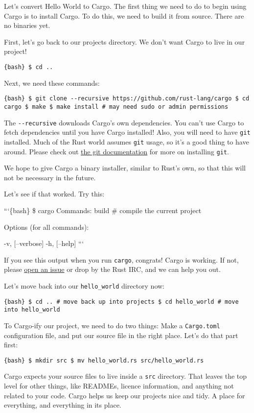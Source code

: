 \documentclass[]{article}
\begin{document}
Let's convert Hello World to Cargo. The first thing we need to do to
begin using Cargo is to install Cargo. To do this, we need to build it
from source. There are no binaries yet.

First, let's go back to our projects directory. We don't want Cargo to
live in our project!

\texttt{\{bash\} \$ cd ..}

Next, we need these commands:

\texttt{\{bash\} \$ git clone -\/-recursive https://github.com/rust-lang/cargo \$ cd cargo \$ make \$ make install \# may need sudo or admin permissions}

The \texttt{-\/-recursive} downloads Cargo's own dependencies. You can't
use Cargo to fetch dependencies until you have Cargo installed! Also,
you will need to have \texttt{git} installed. Much of the Rust world
assumes \texttt{git} usage, so it's a good thing to have around. Please
check out
\href{http://git-scm.com/book/en/Getting-Started-Installing-Git}{the git
documentation} for more on installing \texttt{git}.

We hope to give Cargo a binary installer, similar to Rust's own, so that
this will not be necessary in the future.

Let's see if that worked. Try this:

```\{bash\} \$ cargo Commands: build \# compile the current project

Options (for all commands):

-v, {[}--verbose{]} -h, {[}--help{]} ```

If you see this output when you run \texttt{cargo}, congrats! Cargo is
working. If not, please
\href{https://github.com/rust-lang/cargo/issues/new}{open an issue} or
drop by the Rust IRC, and we can help you out.

Let's move back into our \texttt{hello\_world} directory now:

\texttt{\{bash\} \$ cd ..              \# move back up into projects \$ cd hello\_world     \# move into hello\_world}

To Cargo-ify our project, we need to do two things: Make a
\texttt{Cargo.toml} configuration file, and put our source file in the
right place. Let's do that part first:

\texttt{\{bash\} \$ mkdir src \$ mv hello\_world.rs src/hello\_world.rs}

Cargo expects your source files to live inside a \texttt{src} directory.
That leaves the top level for other things, like READMEs, licence
information, and anything not related to your code. Cargo helps us keep
our projects nice and tidy. A place for everything, and everything in
its place.
\end{document}
